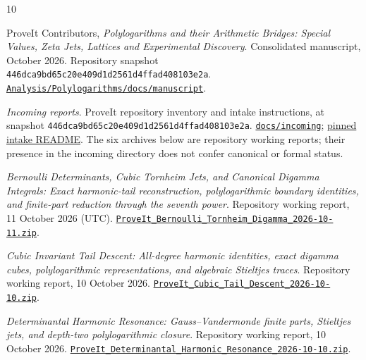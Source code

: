 \begin{thebibliography}{10}
\raggedright

ProveIt Contributors,
\emph{Polylogarithms and their Arithmetic Bridges:
Special Values, Zeta Jets, Lattices and Experimental Discovery}.
Consolidated manuscript, October 2026.
Repository snapshot
\texttt{446dca9bd65c20e409d1d2561d4ffad408103e2a}.
\href{https://github.com/VladimirReshetnikov/ProveIt/tree/446dca9bd65c20e409d1d2561d4ffad408103e2a/Analysis/Polylogarithms/docs/manuscript}
{\nolinkurl{Analysis/Polylogarithms/docs/manuscript}}.

\emph{Incoming reports}.
ProveIt repository inventory and intake instructions, at snapshot
\texttt{446dca9bd65c20e409d1d2561d4ffad408103e2a}.
\href{https://github.com/VladimirReshetnikov/ProveIt/tree/446dca9bd65c20e409d1d2561d4ffad408103e2a/docs/incoming}
{\nolinkurl{docs/incoming}};
\href{https://raw.githubusercontent.com/VladimirReshetnikov/ProveIt/446dca9bd65c20e409d1d2561d4ffad408103e2a/docs/incoming/README.md}
{pinned intake README}.
The six archives below are repository working reports; their presence
in the incoming directory does not confer canonical or formal status.

\emph{Bernoulli Determinants, Cubic Tornheim Jets, and Canonical Digamma
Integrals: Exact harmonic-tail reconstruction, polylogarithmic boundary
identities, and finite-part reduction through the seventh power}.
Repository working report, 11 October 2026 (UTC).
\href{https://raw.githubusercontent.com/VladimirReshetnikov/ProveIt/446dca9bd65c20e409d1d2561d4ffad408103e2a/docs/incoming/ProveIt_Bernoulli_Tornheim_Digamma_2026-10-11.zip}
{\nolinkurl{ProveIt_Bernoulli_Tornheim_Digamma_2026-10-11.zip}}.

\emph{Cubic Invariant Tail Descent: All-degree harmonic identities,
exact digamma cubes, polylogarithmic representations, and algebraic
Stieltjes traces}.
Repository working report, 10 October 2026.
\href{https://raw.githubusercontent.com/VladimirReshetnikov/ProveIt/446dca9bd65c20e409d1d2561d4ffad408103e2a/docs/incoming/ProveIt_Cubic_Tail_Descent_2026-10-10.zip}
{\nolinkurl{ProveIt_Cubic_Tail_Descent_2026-10-10.zip}}.

\emph{Determinantal Harmonic Resonance: Gauss--Vandermonde finite
parts, Stieltjes jets, and depth-two polylogarithmic closure}.
Repository working report, 10 October 2026.
\href{https://raw.githubusercontent.com/VladimirReshetnikov/ProveIt/446dca9bd65c20e409d1d2561d4ffad408103e2a/docs/incoming/ProveIt_Determinantal_Harmonic_Resonance_2026-10-10.zip}
{\nolinkurl{ProveIt_Determinantal_Harmonic_Resonance_2026-10-10.zip}}.


\end{thebibliography}
